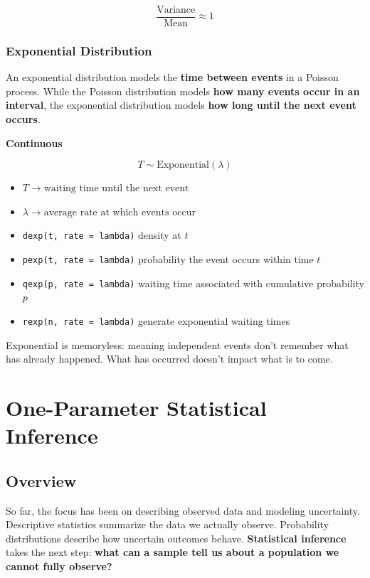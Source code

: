\documentclass[
  letterpaper,
  DIV=11,
  numbers=noendperiod]{scrreprt}
\begin{document}
\[
\frac{\text{Variance}}{\text{Mean}} \approx 1
\]

\subsection{Exponential Distribution}\label{exponential-distribution}

An exponential distribution models the \textbf{time between events} in a
Poisson process. While the Poisson distribution models \textbf{how many
events occur in an interval}, the exponential distribution models
\textbf{how long until the next event occurs}.

\textbf{Continuous}

\[
T \sim \text{Exponential}(\lambda)
\]

\begin{itemize}
\item
  \(T \rightarrow \text{waiting time until the next event}\)
\item
  \(\lambda \rightarrow \text{average rate at which events occur}\)
\item
  \texttt{dexp(t,\ rate\ =\ lambda)} density at \(t\)
\item
  \texttt{pexp(t,\ rate\ =\ lambda)} probability the event occurs within
  time \(t\)
\item
  \texttt{qexp(p,\ rate\ =\ lambda)} waiting time associated with
  cumulative probability \(p\)
\item
  \texttt{rexp(n,\ rate\ =\ lambda)} generate exponential waiting times
\end{itemize}

Exponential is memoryless: meaning independent events don't remember
what has already happened. What has occurred doesn't impact what is to
come.


\chapter{One-Parameter Statistical
Inference}\label{one-parameter-statistical-inference}

\section{Overview}\label{overview-4}

So far, the focus has been on describing observed data and modeling
uncertainty. Descriptive statistics summarize the data we actually
observe. Probability distributions describe how uncertain outcomes
behave. \textbf{Statistical inference} takes the next step: \textbf{what
can a sample tell us about a population we cannot fully observe?}
\end{document}

